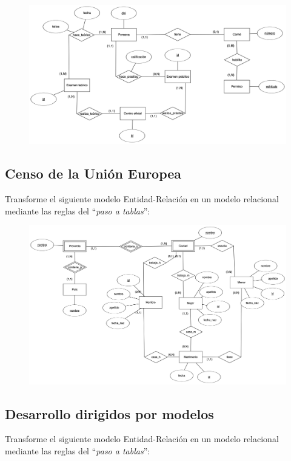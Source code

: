\documentclass{db-practice}
\begin{document}
\begin{figure}[H]
    \centering
    \includegraphics[width=\textwidth]{figs/paso-a-tablas/permiso-de-circulacion}
\end{figure}

\subsection{Censo de la Unión Europea}

Transforme el siguiente modelo Entidad-Relación en un modelo relacional mediante las reglas del ``\textit{paso a tablas}'':

\begin{figure}[H]
    \centering
    \includegraphics[width=.9\textwidth]{figs/paso-a-tablas/censo-union-europea}
\end{figure}

\subsection{Desarrollo dirigidos por modelos}

Transforme el siguiente modelo Entidad-Relación en un modelo relacional mediante las reglas del ``\textit{paso a tablas}'':
\end{document}

